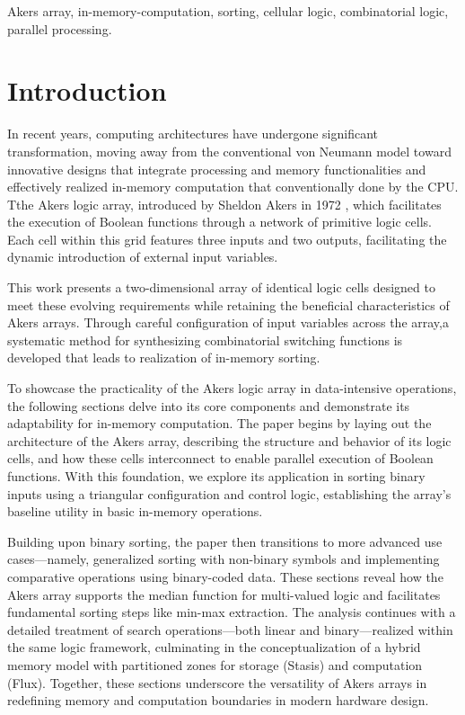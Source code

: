 \documentclass[conference]{IEEEtran}
\begin{document}
\begin{IEEEkeywords}
Akers array, in-memory-computation, sorting, cellular logic, combinatorial logic, parallel processing.
\end{IEEEkeywords}

\section{Introduction}

In recent years, computing architectures have undergone significant transformation, moving away from the conventional von Neumann model toward innovative designs that integrate processing and memory functionalities and effectively realized in-memory computation that conventionally done by the CPU. Tthe Akers logic array, introduced by Sheldon Akers in 1972 \cite{5009040}, which facilitates the execution of Boolean functions through a network of primitive logic cells. Each cell within this grid features three inputs and two outputs, facilitating the dynamic introduction of external input variables.

 This work presents a two-dimensional array of identical logic cells designed to meet these evolving requirements while retaining the beneficial characteristics of Akers arrays. Through careful configuration of input variables across the array,a systematic method for synthesizing combinatorial switching functions is developed that leads to realization of in-memory sorting.

To showcase the practicality of the Akers logic array in data-intensive operations, the following sections delve into its core components and demonstrate its adaptability for in-memory computation. The paper begins by laying out the architecture of the Akers array, describing the structure and behavior of its logic cells, and how these cells interconnect to enable parallel execution of Boolean functions. With this foundation, we explore its application in sorting binary inputs using a triangular configuration and control logic, establishing the array’s baseline utility in basic in-memory operations.

Building upon binary sorting, the paper then transitions to more advanced use cases—namely, generalized sorting with non-binary symbols and implementing comparative operations using binary-coded data. These sections reveal how the Akers array supports the median function for multi-valued logic and facilitates fundamental sorting steps like min-max extraction. The analysis continues with a detailed treatment of search operations—both linear and binary—realized within the same logic framework, culminating in the conceptualization of a hybrid memory model with partitioned zones for storage (Stasis) and computation (Flux). Together, these sections underscore the versatility of Akers arrays in redefining memory and computation boundaries in modern hardware design.
\medskip
\end{document}
